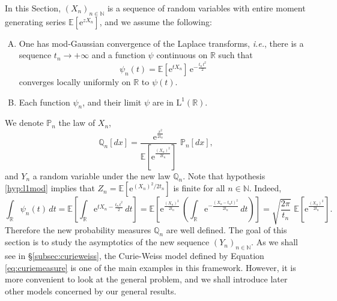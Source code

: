 \documentclass[12pt,a4paper,reqno]{amsart}
\newcommand{\N}{\mathbb{N}}
\newcommand{\R}{\mathbb{R}}
\newcommand{\E}{\mathrm{e}}
\newcommand{\esper}{\mathbb{E}}
\newcommand{\proba}{\mathbb{P}}
\newcommand{\qproba}{\mathbb{Q}}
\theoremstyle{remark}
\begin{document}
In this Section, $(X_n)_{n \in \N}$ is a sequence of random variables with entire moment generating series $\esper[\E^{zX_n}]$, and we assume the following:\vspace{2mm}
\begin{enumerate}[(A)]
\item One has mod-Gaussian convergence of the Laplace transforms, \emph{i.e.}, there is a sequence $t_n \to +\infty$ and a function $\psi$ continuous on $\R$ such that
$$\psi_n(t)=\esper[\E^{tX_n}]\,\E^{-\frac{t_n\,t^2}{2}}$$
converges locally uniformly on $\R$ to $\psi(t)$.\label{hyp:laplacemod}\vspace{1mm}
\item Each function $\psi_n$, and their limit $\psi$ are in $\mathrm{L}^1(\R)$.\label{hyp:l1mod}\vspace{1mm}
\end{enumerate}
We denote $\proba_n$ the law of $X_n$, 
\begin{equation}
\qproba_n[dx]=\frac{\E^{\frac{x^2}{2t_n}}}{\esper\!\left[\E^{\frac{(X_n)^2}{2t_n}}\right]}\,\,\proba_n[dx],\label{eq:exponchange}
\end{equation}
and $Y_n$ a random variable under the new law $\qproba_n$. Note that hypothesis \eqref{hyp:l1mod} implies that $Z_n=\esper[\E^{(X_n)^2/2t_n}]$ is finite for all $n \in \N$. Indeed,
$$
\int_{\R} \psi_n(t)\,dt = \esper\!\left[\int_{\R} \E^{t X_n-\frac{t_n \,t^2}{2}}\,dt\right]=\esper\!\left[\E^{\frac{(X_n)^2}{2t_n}}\,\left(\int_\R \E^{-\frac{(X_n-t_n t)^2}{2t_n}}\,dt\right)\right]=\sqrt{\frac{2\pi}{t_n}}\,\,\esper\!\left[\E^{\frac{(X_n)^2}{2t_n}}\right].
$$
Therefore the new probability measures $\qproba_n$ are well defined. The goal of this section is  to study the asymptotics of the new sequence $(Y_n)_{n \in \N}$. As we shall see in \S\ref{subsec:curieweiss}, the Curie-Weiss model defined by Equation \eqref{eq:curiemeasure} is one of the main examples in this framework. However, it is more convenient to look at the general problem, and we shall introduce later other models concerned by our general results.
\medskip

 
\end{document}
